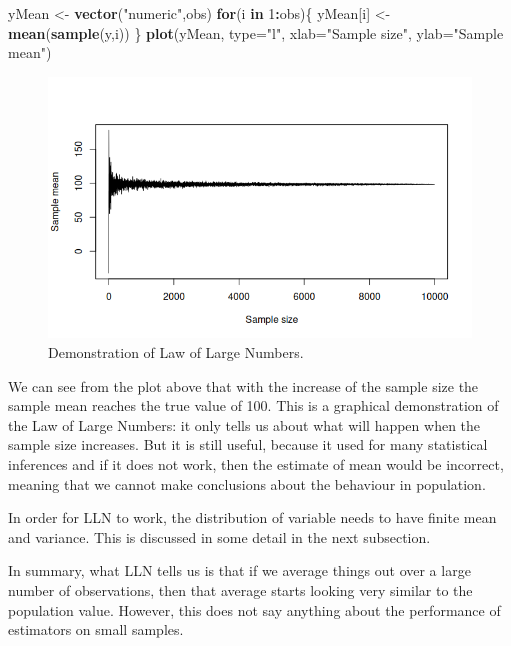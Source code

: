 \documentclass[
]{book}
\newenvironment{Shaded}{\begin{snugshade}}{\end{snugshade}}
\newcommand{\ControlFlowTok}[1]{\textcolor[rgb]{0.13,0.29,0.53}{\textbf{#1}}}
\newcommand{\DataTypeTok}[1]{\textcolor[rgb]{0.13,0.29,0.53}{#1}}
\newcommand{\DecValTok}[1]{\textcolor[rgb]{0.00,0.00,0.81}{#1}}
\newcommand{\KeywordTok}[1]{\textcolor[rgb]{0.13,0.29,0.53}{\textbf{#1}}}
\newcommand{\NormalTok}[1]{#1}
\newcommand{\OperatorTok}[1]{\textcolor[rgb]{0.81,0.36,0.00}{\textbf{#1}}}
\newcommand{\StringTok}[1]{\textcolor[rgb]{0.31,0.60,0.02}{#1}}
\theoremstyle{definition}
\theoremstyle{definition}
\theoremstyle{definition}
\theoremstyle{definition}
\theoremstyle{remark}
\begin{document}
\begin{Shaded}
\begin{Highlighting}[]
\NormalTok{yMean \textless{}{-}}\StringTok{ }\KeywordTok{vector}\NormalTok{(}\StringTok{"numeric"}\NormalTok{,obs)}
\ControlFlowTok{for}\NormalTok{(i }\ControlFlowTok{in} \DecValTok{1}\OperatorTok{:}\NormalTok{obs)\{}
\NormalTok{    yMean[i] \textless{}{-}}\StringTok{ }\KeywordTok{mean}\NormalTok{(}\KeywordTok{sample}\NormalTok{(y,i))}
\NormalTok{\}}
\KeywordTok{plot}\NormalTok{(yMean, }\DataTypeTok{type=}\StringTok{"l"}\NormalTok{, }\DataTypeTok{xlab=}\StringTok{"Sample size"}\NormalTok{, }\DataTypeTok{ylab=}\StringTok{"Sample mean"}\NormalTok{)}
\end{Highlighting}
\end{Shaded}

\begin{figure}
\centering
\includegraphics{images/02-statistics-LLN.png}
\caption{\label{fig:statsSampleMean}Demonstration of Law of Large Numbers.}
\end{figure}

We can see from the plot above that with the increase of the sample size the sample mean reaches the true value of 100. This is a graphical demonstration of the Law of Large Numbers: it only tells us about what will happen when the sample size increases. But it is still useful, because it used for many statistical inferences and if it does not work, then the estimate of mean would be incorrect, meaning that we cannot make conclusions about the behaviour in population.

In order for LLN to work, the distribution of variable needs to have finite mean and variance. This is discussed in some detail in the next subsection.

In summary, what LLN tells us is that if we average things out over a large number of observations, then that average starts looking very similar to the population value. However, this does not say anything about the performance of estimators on small samples.
\end{document}
